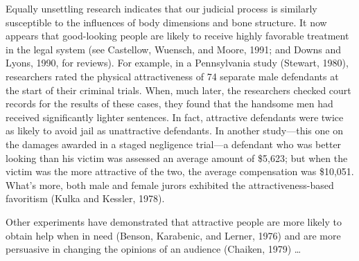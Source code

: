 {
 Equally unsettling research indicates that our judicial process is
similarly susceptible to the influences of body dimensions and bone
structure. It now appears that good-looking people are likely to
receive highly favorable treatment in the legal system (see Castellow,
Wuensch, and Moore, 1991; and Downs and Lyons, 1990, for
reviews). For example, in a Pennsylvania study
(Stewart, 1980), researchers rated the physical
attractiveness of 74 separate male defendants at the start of their
criminal trials. When, much later, the researchers checked court
records for the results of these cases, they found that the handsome
men had received significantly lighter sentences. In fact, attractive
defendants were twice as likely to avoid jail as unattractive
defendants. In another study---this one on the damages awarded in a
staged negligence trial---a defendant who was better looking than his
victim was assessed an average amount of \$5,623; but when the victim
was the more attractive of the two, the average compensation was
\$10,051. What's more, both male and female jurors
exhibited the attractiveness-based favoritism (Kulka and Kessler,
1978).}

{
 Other experiments have demonstrated that attractive people are
more likely to obtain help when in need (Benson, Karabenic, and Lerner,
1976) and are more persuasive in changing the
opinions of an audience (Chaiken, 1979) \ldots{}}

